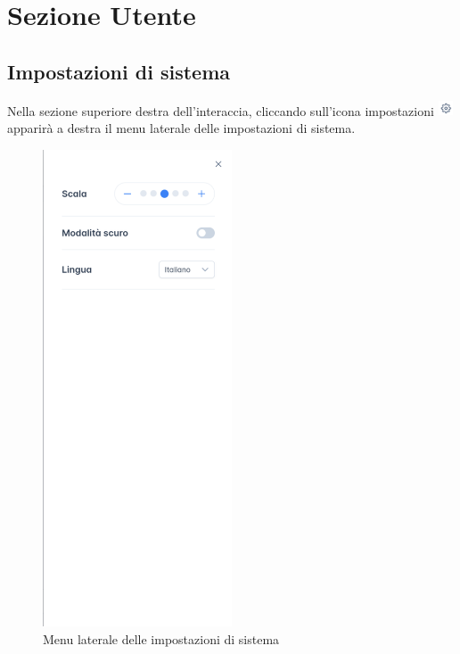 \section{Sezione Utente}
\label{sec:sezUtente}

\subsection{Impostazioni di sistema}
Nella sezione superiore destra dell'interaccia, cliccando sull'icona impostazioni \includegraphics[height=1.2em]{assets/settings_icon.png} apparirà a destra il menu laterale delle impostazioni di sistema.
\begin{figure}[H]
  \centering
  \includegraphics[width=0.50\textwidth]{assets/menu_config.png}
  \caption{Menu laterale delle impostazioni di sistema}
\end{figure}
